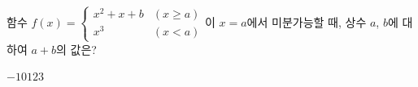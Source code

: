 함수 $f(x)=\begin{cases} x^2+x+b & (x\ge a) \\ x^3 & (x<a) \end{cases}$이 $x=a$에서 미분가능할 때, 상수 $a$, $b$에 대하여 $a+b$의 값은? 
\begin{choices32}{$-1$}{$0$}{$1$}{$2$}{$3$}\end{choices32}
